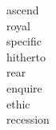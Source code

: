 \documentclass[a4paper, 10pt]{ctexart}
\begin{document}
\begin{multicols*}{2}
\begin{description}
\item[ascend]

\item[royal]

\item[specific]

\item[hitherto]

\item[rear]

\item[enquire]

\item[ethic]

\item[recession]

    \end{description}
\end{multicols*}
\end{document}
